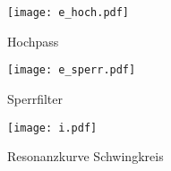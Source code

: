 \documentclass[11pt, ngerman]{article}
\begin{document}
\begin{figure}[h]
	\centering
	\texttt{[image: e\_hoch.pdf]}
	\caption{Hochpass}
	\label{fig:Aufgabe e Hochpass}
\end{figure}

\begin{figure}[h]
	\centering
	\texttt{[image: e\_sperr.pdf]}
	\caption{Sperrfilter}
	\label{fig:Aufgabe e Sperrfilter}
\end{figure}

\begin{figure}[h]
	\centering
	\texttt{[image: i.pdf]}
	\caption{Resonanzkurve Schwingkreis}
	\label{fig:Aufgabe i}
\end{figure}
\end{document}
